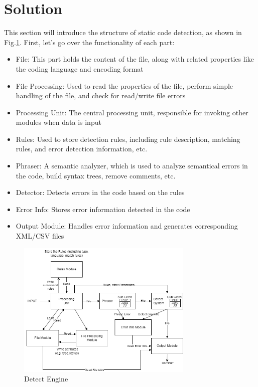 \documentclass[journal]{IEEEtran}
\begin{document}
\section{Solution}
\noindent This section will introduce the structure of static code detection, as shown in Fig.\ref{fig:detectengine}. First, let's go over the functionality of each part:
\begin{itemize}
  \item File: This part holds the content of the file, along with related properties like the coding language and encoding format
  \item File Processing: Used to read the properties of the file, perform simple handling of the file, and check for read/write file errors
  \item Processing Unit: The central processing unit, responsible for invoking other modules when data is input
  \item Rules: Used to store detection rules, including rule description, matching rules, and error detection information, etc.
  \item Phraser: A semantic analyzer, which is used to analyze semantical errors in the code, build syntax trees, remove comments, etc.
  \item Detector: Detects errors in the code based on the rules
  \item Error Info: Stores error information detected in the code
  \item Output Module: Handles error information and generates corresponding XML/CSV files
\end{itemize}

\begin{figure}[h]
  \centering
  \includegraphics[width=3.3in]{figures/detectengine.png}
  \caption{Detect Engine}
  \label{fig:detectengine}
  \end{figure}
\end{document}
